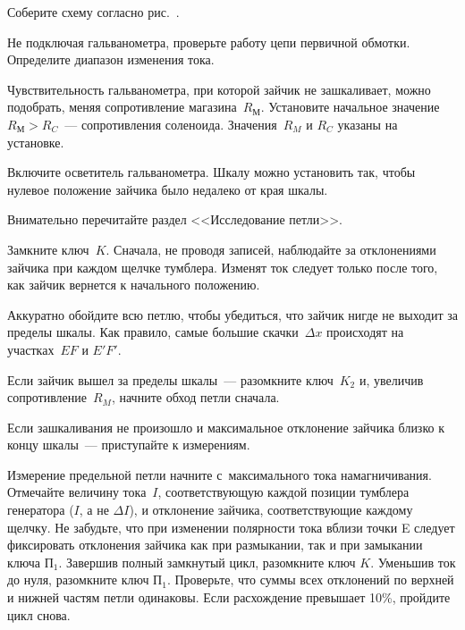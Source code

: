\begin{lab:task}


	\item Соберите схему согласно рис.~.

	\item Не подключая гальванометра, проверьте работу цепи первичной обмотки.
Определите диапазон изменения тока.

	\item Чувствительность гальванометра, при которой зайчик не зашкаливает,
можно подобрать, меняя сопротивление
	магазина~$R_М$. Установите начальное значение~$R_М>R_C$~--- сопротивления
соленоида. Значения~$R_M$ и $R_C$ указаны на
	установке.

	Включите осветитель гальванометра. Шкалу можно установить так, чтобы нулевое
положение зайчика было недалеко от края
	шкалы.

	\begin{lab:warning}
		Внимательно перечитайте раздел <<Исследование петли>>.
	\end{lab:warning}

	\item Замкните ключ~$K$. Сначала, не проводя записей, наблюдайте за
отклонениями зайчика при каждом щелчке тумблера. Изменят ток следует только
после того, как зайчик вернется к начального положению.

	Аккуратно обойдите всю петлю, чтобы убедиться, что зайчик нигде не выходит
за пределы шкалы. Как правило, самые большие
	скачки~$\Delta x$ происходят на участках~$EF$ и $E'F'$.

	Если зайчик вышел за пределы шкалы~--- разомкните ключ~$K_2$ и, увеличив
сопротивление~$R_M$, начните обход петли
	сначала.

	Если зашкаливания не произошло и максимальное отклонение зайчика близко к
концу шкалы~--- приступайте к измерениям.


	\item Измерение предельной петли начните с~максимального тока
намагничивания. Отмечайте величину тока~$I$, соответствующую
	каждой позиции тумблера генератора ($I$, а не $\Delta I$), и отклонение
зайчика, соответствующие каждому щелчку.
	Не забудьте, что при изменении полярности тока вблизи точки E следует
фиксировать отклонения зайчика как при размыкании, так и при замыкании ключа
$\text{П}_1$.
	Завершив полный  замкнутый цикл,  разомкните ключ $K$. Уменьшив ток до нуля,
разомкните ключ $\text{П}_1$.
	Проверьте, что суммы всех отклонений по верхней и нижней частям петли
одинаковы. Если расхождение превышает 10\%, пройдите цикл снова.


\end{lab:task}
